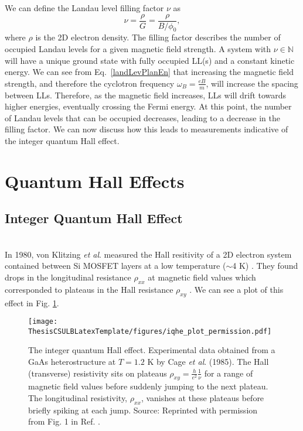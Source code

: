     We can define the Landau level filling factor $\nu$ as
    \begin{equation} \label{fillFact}
    \nu=\frac{\rho}{G}=\frac{\rho}{B/\phi_0}, 
    \end{equation}
    where $\rho$ is the 2D electron density. The filling factor describes the number of occupied Landau levels for a given magnetic field strength. A system with $\nu\in\mathbb{N}$ will have a unique ground state with fully occupied LL(s) and a constant kinetic energy. We can see from Eq.~\ref{landLevPlanEn} that increasing the magnetic field strength, and therefore the cyclotron frequency $\omega_B=\frac{eB}{m}$, will increase the spacing between LLs. Therefore, as the magnetic field increases, LLs will drift towards higher energies, eventually crossing the Fermi energy. At this point, the number of Landau levels that can be occupied decreases, leading to a decrease in the filling factor. We can now discuss how this leads to measurements indicative of the integer quantum Hall effect.
	
\section{Quantum Hall Effects}\label{sec:quantHallEff}

        \subsection{Integer Quantum Hall Effect}\label{ssec:intQuantHallEff}\\
        
            In 1980, von Klitzing \textit{et al}. measured the Hall resitivity of a 2D electron system contained between Si MOSFET layers at a low temperature ($\sim$4 K) \cite{klitzing}. They found drops in the longitudinal resistance $\rho_{xx}$ at magnetic field values which corresponded to plateaus in the Hall resistance $\rho_{xy}$ \cite{klitzing}. We can see a plot of this effect in Fig. \ref{iqhePlot}.
		
    	\begin{figure}[h]
            \begin{center}
            \texttt{[image: ThesisCSULBLatexTemplate/figures/iqhe\_plot\_permission.pdf]}
            \caption[The integer quantum Hall effect.]{The integer quantum Hall effect. Experimental data obtained from a GaAs heterostructure at $T=1.2$ K by Cage \textit{et al}. (1985). The Hall (transverse) resistivity sits on plateaus $\rho_{xy}=\frac{h}{e^2}\frac{1}{\nu}$ for a range of magnetic field values before suddenly jumping to the next plateau. The longitudinal resistivity, $\rho_{xx}$, vanishes at these plateaus before briefly spiking at each jump. Source: Reprinted with permission from Fig. 1 in  Ref. \cite{yennie}.}
            \label{iqhePlot}
            \end{center}
            \end{figure}
            
